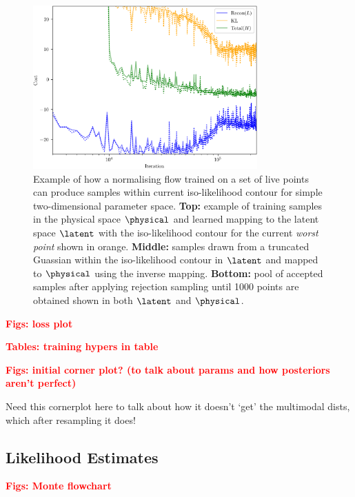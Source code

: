 \documentclass[aps,superscriptaddress,twocolumn,nopreprintnumbers,floatfix,groupedaddress]{revtex4-1}
\newcommand{\figwidth}{8.6cm}
\begin{document}
\begin{figure}
	\centering
	\includegraphics[width=\figwidth]{figs/cost.png}
	\caption{Example of how a normalising flow trained on a set of live points can produce samples within current iso-likelihood contour for simple two-dimensional parameter space. \textbf{Top:} example of training samples in the physical space $\physical$ and learned mapping to the latent space $\latent$ with the iso-likelihood contour for the current \textit{worst point} shown in orange. \textbf{Middle:} samples drawn from a truncated Guassian within the iso-likelihood contour in $\latent$ and mapped to $\physical$ using the inverse mapping. \textbf{Bottom:} pool of accepted samples after applying rejection sampling until 1000 points are obtained shown in both $\latent$ and $\physical$.}
	\label{fig:learning_contours}
\end{figure}

\textbf{\textcolor{red}{Figs: loss plot}}

\textbf{\textcolor{red}{Tables: training hypers in table}}

\textbf{\textcolor{red}{Figs: initial corner plot? (to talk about params and how posteriors aren't perfect)}}

Need this cornerplot here to talk about how it doesn't `get' the multimodal dists, which after resampling it does!

\subsection{Likelihood Estimates}

\textbf{\textcolor{red}{Figs: Monte flowchart}}
\end{document}
